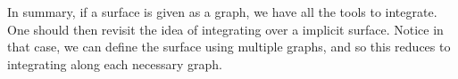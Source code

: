                                    	In summary, if a surface is given as a graph, we have all the tools to integrate.  One should then revisit the idea of integrating over a implicit surface. Notice in that case, we can define the surface using multiple graphs, and so this reduces to integrating along each necessary graph.                        
                                        
